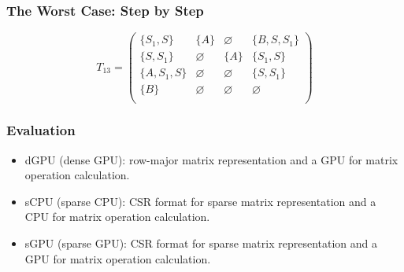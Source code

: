 \documentclass[xcolor=table]{beamer}
\begin{document}
\begin{frame}[noframenumbering]
  \transwipe[direction=90]
  \frametitle{The Worst Case: Step by Step}

\begin{figure}[h]
\[
T_{13} = \begin{pmatrix}
\{S_1, S\}     & \{A\}       & \varnothing & \{B, S, S_1\}    \\
\{S, S_1\}       & \varnothing & \{A\}       & \{S_1, S\}     \\
\{A, S_1, S\}  & \varnothing & \varnothing & \{S, S_1\} \\
\{B\}       & \varnothing & \varnothing & \varnothing \\
\end{pmatrix}
\]
\label{ExampleQueryFirstIteration}
\end{figure}
\end{frame}        
            
\begin{frame}
  \transwipe[direction=90]
  \frametitle{Evaluation}

\begin{itemize}
    \item dGPU (dense GPU): row-major matrix representation and a GPU for matrix operation calculation. 
    \item sCPU (sparse CPU): CSR format for sparse matrix representation and a CPU for matrix operation calculation. 
    \item sGPU (sparse GPU): CSR format for sparse matrix representation and a GPU for matrix operation calculation.
\end{itemize}


\end{frame}
       
\end{document}
